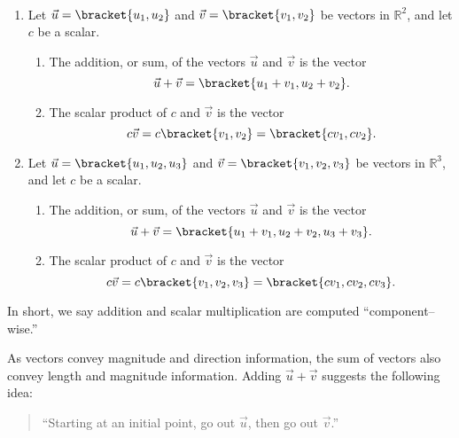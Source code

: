{\mbox{}\\[-2\baselineskip]\begin{enumerate}
	\item Let $\vec u =\bracket{u_1,u_2}$ and $\vec v =\bracket{v_1,v_2}$ be vectors in $\mathbb{R}^2$, and let $c$ be a scalar. 
		\begin{enumerate}
			\item The addition, or sum, of the vectors $\vec u$ and $\vec v$ is the vector
			$$\vec u+\vec v =\bracket{u_1+v_1, u_2+v_2}.$$
			\item	The scalar product of $c$ and $\vec v$ is the vector 
			$$c\vec v = c\bracket{v_1,v_2}=\bracket{cv_1,cv_2}.$$
		\end{enumerate}
	\item Let $\vec u =\bracket{u_1,u_2,u_3}$ and $\vec v =\bracket{v_1,v_2,v_3}$ be vectors in $\mathbb{R}^3$, and let $c$ be a scalar. 
		\begin{enumerate}
			\item The addition, or sum, of the vectors $\vec u$ and $\vec v$ is the vector
			$$\vec u+\vec v =\bracket{u_1+v_1, u_2+v_2, u_3+v_3}.$$
			\item	The scalar product of $c$ and $\vec v$ is the vector 
			$$c\vec v = c\bracket{v_1,v_2,v_3}=\bracket{cv_1,cv_2,cv_3}.$$
		\end{enumerate}
\end{enumerate}}

In short, we say addition and scalar multiplication are computed ``component--wise.''

	
As vectors convey magnitude and direction information, the sum of vectors also convey length and magnitude information. Adding $\vec u+\vec v$ suggests the following idea:
\begin{quotation}
``Starting at an initial point, go out $\vec u$, then go out $\vec v$.''
\end{quotation}

